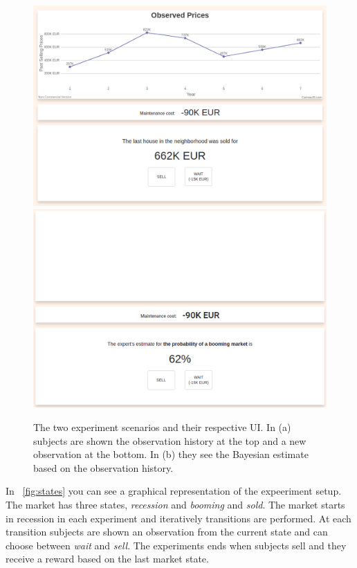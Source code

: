 \begin{figure}[!htbp]
    \centering
    \includegraphics[width=0.99\linewidth]{img/methods/experiment_obs_1.png}\\
    \includegraphics[width=0.99\linewidth]{img/methods/experiment_bel_1.png}\\
    \caption{The two experiment scenarios and their respective UI. In (a) subjects are shown the observation history at the top and a new observation at the bottom. In (b) they see the Bayesian estimate based on the observation history.}\label{fig:user-interface}
\end{figure}

In ~\autoref{fig:states} you can see a graphical representation of the expeeriment setup. The market has three states, \textit{recession} and \textit{booming} and \textit{sold}. The market starts in recession in each experiment and iteratively transitions are performed. At each transition subjects are shown an observation from the current state and can choose between \textit{wait} and \textit{sell}. The experiments ends when subjects sell and they receive a reward based on the last market state.

